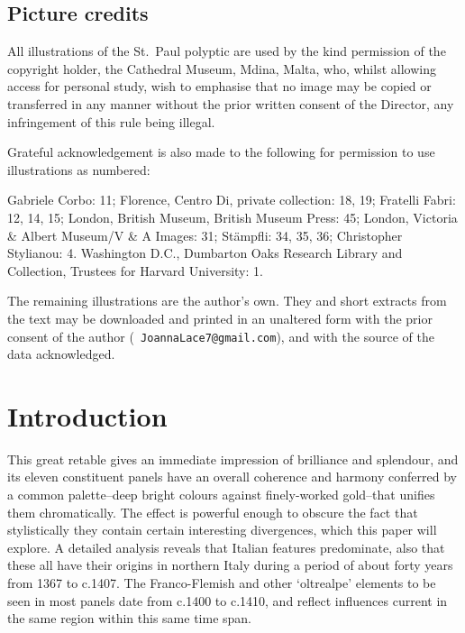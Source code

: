 \documentclass[a4paper,12pt]{article}
\begin{document}
\subsection*{Picture credits}

All illustrations of the St.~Paul polyptic are used by the kind
permission of the copyright holder, the Cathedral Museum, Mdina,
Malta, who, whilst allowing access for personal study, wish to
emphasise that no image may be copied or transferred in any manner
without the prior written consent of the Director, any infringement of
this rule being illegal.  

Grateful acknowledgement is also made to the following for permission
to use illustrations as numbered:

Gabriele Corbo: 11; Florence, Centro Di, private collection: 18, 19;
Fratelli Fabri: 12, 14, 15; London, British Museum, British Museum
Press: 45; London, Victoria \& Albert Museum/V \& A Images: 31;
St\"ampfli: 34, 35, 36; Christopher Stylianou: 4.  Washington D.C.,
Dumbarton Oaks Research Library and Collection, Trustees for Harvard
University: 1.

The remaining illustrations are the author's own.  They and short
extracts from the text may be downloaded and printed in an unaltered
form with the prior consent of the author ({\tt
JoannaLace7@gmail.com}), and with the source of the data
acknowledged.


\newpage
\tableofcontents
\section{ Introduction}

This great retable gives an immediate impression of brilliance and
splendour, and its eleven constituent panels have an overall coherence
and harmony conferred by a common palette--deep bright colours
against finely-worked gold--that unifies them chromatically. The
effect is powerful enough to obscure the fact that stylistically they
contain certain interesting divergences, which this paper will
explore.  A detailed analysis reveals that Italian features
predominate, also that these all have their origins in northern Italy
during a period of about forty years from 1367 to c.1407. The
Franco-Flemish and other `oltrealpe' elements to be seen in most
panels date from c.1400 to c.1410, and reflect influences current in
the same region within this same time span.
\end{document}
